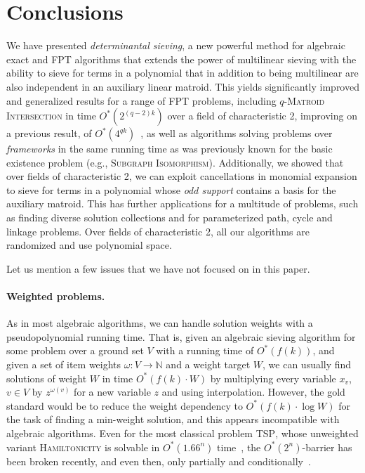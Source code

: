 \documentclass[10pt,a4paper]{article}
\newcommand{\N}{\ensuremath{\mathbb N}\xspace}
\begin{document}
\section{Conclusions} \label{sec:conc}

We have presented \emph{determinantal sieving}, a new powerful method
for algebraic exact and FPT algorithms that
extends the power of multilinear sieving with the ability to sieve for
terms in a polynomial that in addition to being multilinear are also
independent in an auxiliary linear matroid.
This yields significantly improved and generalized results for a range
of FPT problems, including \textsc{$q$-Matroid Intersection} in time $O^*(2^{(q-2)k})$
over a field of characteristic 2, improving on a previous result, of $O^*(4^{qk})$~\cite{BrandP21},
as well as algorithms solving problems over \emph{frameworks}
in the same running time as was previously known for the basic
existence problem (e.g., \textsc{Subgraph Isomorphism}).
Additionally, we showed that over fields of characteristic 2,
we can exploit cancellations in monomial expansion to
sieve for terms in a polynomial whose \emph{odd support} contains a
basis for the auxiliary matroid. 
This has further applications for a multitude of problems,
such as finding diverse solution collections and
for parameterized path, cycle and linkage problems.
Over fields of characteristic 2, 
all our algorithms are randomized and use polynomial space. 

Let us mention a few issues that we have not focused on in this paper.

\paragraph{Weighted problems.} As in most algebraic algorithms, we can
handle solution weights with a pseudopolynomial running time. That is,
given an algebraic sieving algorithm for some problem over a ground set $V$
with a running time of $O^*(f(k))$, and given a set of item weights
$\omega \colon V \to \N$ and a weight target $W$, we can usually find
solutions of weight $W$ in time $O^*(f(k) \cdot W)$
by multiplying every variable $x_v$, $v \in V$
by $z^{\omega(v)}$ for a new variable $z$ and using interpolation.
However, the gold standard would be to reduce the weight dependency
to $O^*(f(k) \cdot \log W)$ for the task of finding a min-weight solution,
and this appears incompatible with algebraic algorithms.
Even for the most classical problem \textsc{TSP}, whose unweighted
variant \textsc{Hamiltonicity} is solvable in $O^*(1.66^n)$ time~\cite{Bjorklund14detsum},
the $O^*(2^n)$-barrier has been broken recently, and even then,
only partially and conditionally~\cite{Nederlof20TSP}.
\end{document}
